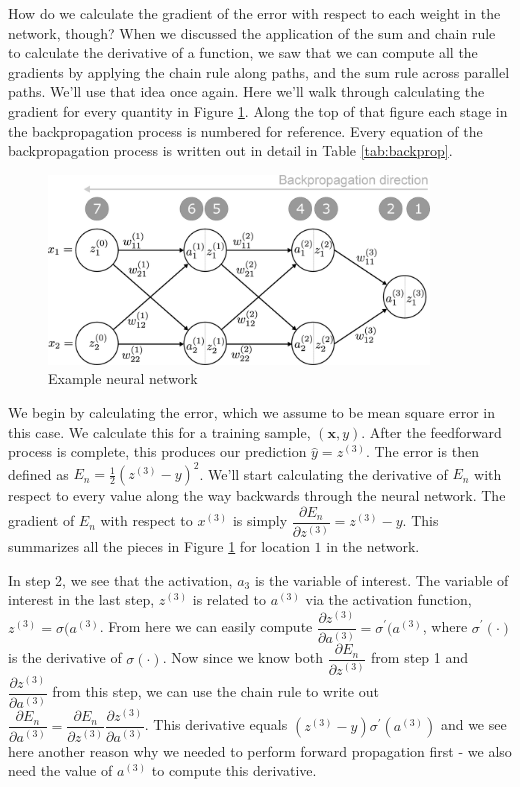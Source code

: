 \documentclass{article}
\begin{document}
How do we calculate the gradient of the error with respect to each weight in the network, though? When we discussed the application of the sum and chain rule to calculate the derivative of a function, we saw that we can compute all the gradients by applying the chain rule along paths, and the sum rule across parallel paths. We'll use that idea once again. Here we'll walk through calculating the gradient for every quantity in Figure \ref{fig:labeled_backprop}. Along the top of that figure each stage in the backpropagation process is numbered for reference. Every equation of the backpropagation process is written out in detail in Table \ref{tab:backprop}.

\begin{figure}[h]
\centering
\includegraphics[width=0.9\textwidth]{./neural_networks_labeled_backprop.eps}
\caption{Example neural network}
\label{fig:labeled_backprop}
\end{figure}

We begin by calculating the error, which we assume to be mean square error in this case. We calculate this for a training sample, $(\mathbf{x}, y)$. After the feedforward process is complete, this produces our prediction $\hat{y} = z^{(3)}$. The error is then defined as $E_n = \frac{1}{2}(z^{(3)} - y)^2$. We'll start calculating the derivative of $E_n$ with respect to every value along the way backwards through the neural network. The gradient of $E_n$ with respect to $x^{(3)}$ is simply $\dfrac{\partial E_n}{\partial z^{(3)}} = z^{(3)} - y$. This summarizes all the pieces in Figure \ref{fig:labeled_backprop} for location $1$ in the network.

In step 2, we see that the activation, $a_3$ is the variable of interest. The variable of interest in the last step, $z^{(3)}$ is related to $a^{(3)}$ via the activation function, $z^{(3)} = \sigma(a^{(3)}$. From here we can easily compute $\dfrac{\partial z^{(3)}}{\partial a^{(3)}} = \sigma^{'}(a^{(3)}$, where $\sigma^{'}(\cdot)$ is the derivative of $\sigma(\cdot)$. Now since we know both $\dfrac{\partial E_n}{\partial z^{(3)}}$ from step 1 and $\dfrac{\partial z^{(3)}}{\partial a^{(3)}}$ from this step, we can use the chain rule to write out $\dfrac{\partial E_n}{\partial a^{(3)}} = \dfrac{\partial E_n}{\partial z^{(3)}} \dfrac{\partial z^{(3)}}{\partial a^{(3)}}$. This derivative equals $(z^{(3)} - y) \sigma^{'}(a^{(3)})$ and we see here another reason why we needed to perform forward propagation first - we also need the value of $a^{(3)}$ to compute this derivative.
\end{document}
